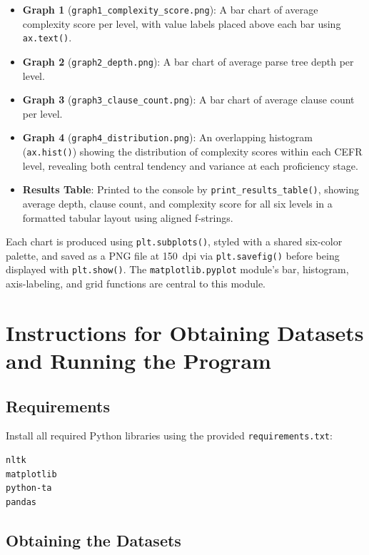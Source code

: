 \documentclass[11pt]{article}
\begin{document}
\begin{itemize}
  \item \textbf{Graph 1} (\texttt{graph1\_complexity\_score.png}): A bar chart of average complexity score per level, with value labels placed above each bar using \texttt{ax.text()}.
  \item \textbf{Graph 2} (\texttt{graph2\_depth.png}): A bar chart of average parse tree depth per level.
  \item \textbf{Graph 3} (\texttt{graph3\_clause\_count.png}): A bar chart of average clause count per level.
  \item \textbf{Graph 4} (\texttt{graph4\_distribution.png}): An overlapping histogram (\texttt{ax.hist()}) showing the distribution of complexity scores within each CEFR level, revealing both central tendency and variance at each proficiency stage.
  \item \textbf{Results Table}: Printed to the console by \texttt{print\_results\_table()}, showing average depth, clause count, and complexity score for all six levels in a formatted tabular layout using aligned f-strings.
\end{itemize}
 
Each chart is produced using \texttt{plt.subplots()}, styled with a shared six-color palette, and saved as a PNG file at 150~dpi via \texttt{plt.savefig()} before being displayed with \texttt{plt.show()}. The \texttt{matplotlib.pyplot} module's bar, histogram, axis-labeling, and grid functions are central to this module.
 
\section*{Instructions for Obtaining Datasets and Running the Program}
 
\subsection*{Requirements}
 
Install all required Python libraries using the provided \texttt{requirements.txt}:
 
\begin{verbatim}
nltk
matplotlib
python-ta
pandas
\end{verbatim}
 
\subsection*{Obtaining the Datasets}
 
\end{document}
